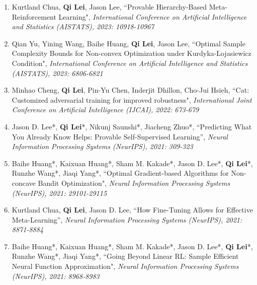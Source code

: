 \documentclass[margin, 10pt]{res} %
\begin{document}
\begin{resume}
\begin{enumerate}
\item{Kurtland Chua, \textbf{Qi Lei}, Jason Lee, ``Provable Hierarchy-Based Meta-Reinforcement Learning", \textit{International Conference on
		Artificial Intelligence and Statistics (AISTATS), 2023: 10918-10967}}
	
	\item{Qian Yu, Yining Wang, Baihe Huang, \textbf{Qi Lei}, Jason Lee, ``Optimal Sample Complexity Bounds for Non-convex Optimization under Kurdyka-Lojasiewicz Condition", \textit{International Conference on
			Artificial Intelligence and Statistics (AISTATS), 2023: 6806-6821}}
	

	
\item{Minhao Cheng, \textbf{Qi Lei}, Pin-Yu Chen, Inderjit Dhillon, Cho-Jui Hsieh, ``Cat: Customized adversarial training for improved robustness", \textit{International Joint Conference on Artificial Intelligence (IJCAI), 2022: 673-679}}
	
		\item {Jason D. Lee*, \textbf{Qi Lei}*, Nikunj Saunshi*, Jiacheng Zhuo*, ``Predicting What You Already Know Helps: Provable Self-Supervised Learning”, \textit{Neural Information Processing Systems (NeurIPS), 2021: 309-323}}


\item {Baihe Huang*, Kaixuan Huang*, Sham M. Kakade*, Jason D. Lee*, \textbf{Qi Lei}*, Runzhe Wang*, Jiaqi Yang*,  ``Optimal Gradient-based Algorithms for Non-concave Bandit Optimization", 	\textit{Neural Information Processing Systems (NeurIPS), 2021: 29101-29115} }


\item 	{ Kurtland Chua, \textbf{Qi Lei}, Jason D. Lee, ``How Fine-Tuning Allows for Effective Meta-Learning”, \textit{Neural Information Processing Systems (NeurIPS), 2021: 8871-8884} }



\item {Baihe Huang*, Kaixuan Huang*, Sham M. Kakade*, Jason D. Lee*, \textbf{Qi Lei}*, Runzhe Wang*, Jiaqi Yang*, ``Going Beyond Linear RL: Sample Efficient Neural Function Approximation", \textit{Neural Information Processing Systems (NeurIPS), 2021: 8968-8983} }
	

\end{enumerate}
\end{resume}
\end{document}
